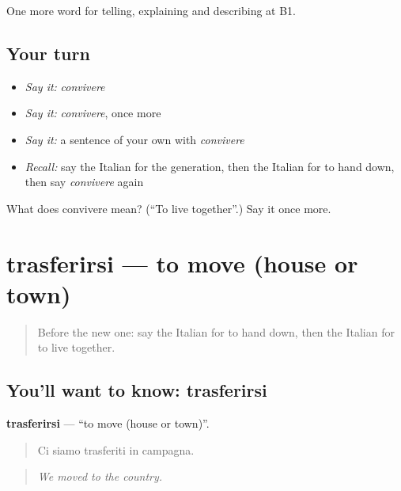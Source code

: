 \begin{grammarlens}[title={What you've built}]
One more word for telling, explaining and describing at B1.
\end{grammarlens}

\subsection*{Your turn}
\begin{itemize}
\raggedright
  \item \emph{Say it:} \emph{convivere}
  \item \emph{Say it:} \emph{convivere}, once more
  \item \emph{Say it:} a sentence of your own with \emph{convivere}
  \item \emph{Recall:} say the Italian for the generation, then the Italian for to hand down, then say \emph{convivere} again
\end{itemize}

\begin{tcolorbox}[breakable,colback=teal!4,colframe=teal!35!black,title={Before you move on}]
What does convivere mean? (\textquotedblleft{}To live together\textquotedblright{}.) Say it once more.
\end{tcolorbox}
\section[trasferirsi]{trasferirsi — to move (house or town)}

\label{lesson:IT-C310-trasferirsi}



\begin{quote}
Before the new one: say the Italian for to hand down, then the Italian for to live together.
\end{quote}

\subsection*{You'll want to know: trasferirsi}
\textbf{trasferirsi} — \textquotedblleft{}to move (house or town)\textquotedblright{}.

\begin{quote}
Ci siamo trasferiti in campagna.
\end{quote}

\begin{quote}
\emph{We moved to the country.}
\end{quote}

